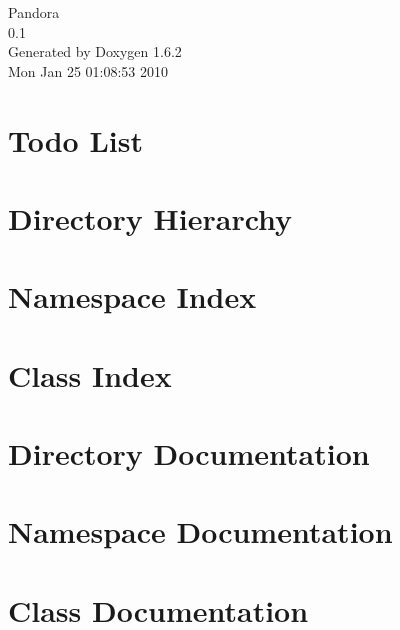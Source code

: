\documentclass[a4paper]{book}
\begin{document}
\hypersetup{pageanchor=false}
\begin{titlepage}
\vspace*{7cm}
\begin{center}
{\Large Pandora \\[1ex]\large 0.1 }\\
\vspace*{1cm}
{\large Generated by Doxygen 1.6.2}\\
\vspace*{0.5cm}
{\small Mon Jan 25 01:08:53 2010}\\
\end{center}
\end{titlepage}
\clearemptydoublepage
{}
\tableofcontents
\clearemptydoublepage
{}
\hypersetup{pageanchor=true}
\chapter{Todo List}
\label{todo}
\hypertarget{todo}{}

\chapter{Directory Hierarchy}

\chapter{Namespace Index}

\chapter{Class Index}

\chapter{Directory Documentation}


\chapter{Namespace Documentation}



\chapter{Class Documentation}









\printindex
\end{document}
